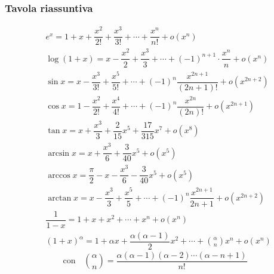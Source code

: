 \clearpage %
\subsubsection{Tavola riassuntiva}
\begin{align*}
	&e^x = 1 + x + \dfrac{x^2}{2!} + \dfrac{x^3}{3!} + \cdots + \dfrac{x^n}{n!} + o(x^n)\\[10pt]
	&\log(1 + x) = x - \dfrac{x^2}{2} + \dfrac{x^3}{3} + \cdots + (-1)^{n+1} \cdot \dfrac{x^n}{n} + o(x^n)\\[10pt]
	&\sin{x} = x - \dfrac{x^3}{3!} + \dfrac{x^5}{5!} + \cdots + (-1)^n \dfrac{x^{2n+1}}{(2n+1)!} + o(x^{2n+2})\\[10pt]
	&\cos{x} = 1 - \dfrac{x^2}{2!} + \dfrac{x^4}{4!} + \cdots + (-1)^n \dfrac{x^{2n}}{(2n)!} + o(x^{2n+1})\\[10pt]
	&\tan{x} = x + \dfrac{x^3}{3} + \dfrac{2}{15}x^5 + \dfrac{17}{315}x^7 + o(x^8)\\[10pt]
	&\arcsin{x} = x + \dfrac{x^3}{6} + \dfrac{3}{40}x^5 + o(x^5)\\[10pt]
	&\arccos{x} = \dfrac{\pi}{2} - x - \dfrac{x^3}{6} - \dfrac{3}{40} x^5 + o(x^5)\\[10pt]
	&\arctan{x} = x - \dfrac{x^3}{3} + \dfrac{x^5}{5} + \cdots + (-1)^n \dfrac{x^{2n+1}}{2n+1} + o(x^{2n+2})\\[10pt]
	&\dfrac{1}{1 - x} = 1 + x + x^2 + \cdots + x^n + o(x^n)\\[10pt]
	&(1 + x)^\alpha = 1 + \alpha x + \dfrac{\alpha(\alpha - 1)}{2} x^2 + \cdots +  \binom{\alpha}{n} x^n + o(x^n)
\end{align*}
\begin{equation*}
	\text{con} \quad \binom{\alpha}{n} = \dfrac{\alpha (\alpha - 1) (\alpha -2) \cdots (\alpha - n + 1)}{n!}
\end{equation*}
